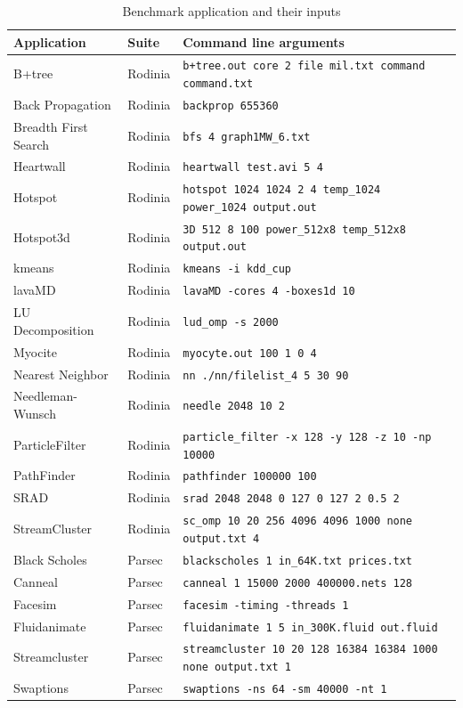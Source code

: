 \documentclass[12pt,twoside]{reedthesis}
\begin{document}
		
		\begin{table}
			\caption{Benchmark application and their inputs}
			\label{all-applications-table}
			\small
			\begin{tabular}{ |l|l|l| }
				\hline
				Application          & Suite   & Command line arguments  \\ \hline
				\hline
				B+tree & Rodinia  &  \texttt{b+tree.out core 2 file mil.txt command command.txt}  \\ \hline
				Back Propagation & Rodinia  &  \texttt{backprop 655360} \\ \hline
				Breadth First Search & Rodinia  &  \texttt{bfs 4 graph1MW\_6.txt}  \\ \hline
				Heartwall & Rodinia  & \texttt{heartwall test.avi 5 4} \\ \hline
				Hotspot & Rodinia  &   \texttt{hotspot 1024 1024 2 4 temp\_1024 power\_1024 output.out} \\ \hline
				Hotspot3d & Rodinia  & \texttt{3D 512 8 100 power\_512x8 temp\_512x8 output.out}   \\ \hline
				kmeans & Rodinia  &    \texttt{kmeans -i kdd\_cup} \\ \hline
				lavaMD & Rodinia  &  \texttt{lavaMD -cores 4 -boxes1d 10}   \\ \hline
				LU Decomposition & Rodinia    &  \texttt{lud\_omp -s 2000} \\ \hline
				Myocite & Rodinia  &  \texttt{myocyte.out 100 1 0 4}  \\ \hline
				Nearest Neighbor & Rodinia  &  \texttt{nn ./nn/filelist\_4 5 30 90}   \\ \hline
				Needleman-Wunsch & Rodinia  & \texttt{needle 2048 10 2}    \\ \hline
				ParticleFilter & Rodinia  &    \texttt{particle\_filter -x 128 -y 128 -z 10 -np 10000} \\ \hline
				PathFinder & Rodinia  &  \texttt{pathfinder 100000 100}   \\ \hline
				SRAD & Rodinia  &  \texttt{srad 2048 2048 0 127 0 127 2 0.5 2}   \\ \hline
				StreamCluster & Rodinia  &    \texttt{sc\_omp 10 20 256 4096 4096 1000 none output.txt 4} \\ \hline
				Black Scholes & Parsec  &  \texttt{blackscholes 1 in\_64K.txt prices.txt} \\ \hline
				Canneal & Parsec  &  \texttt{canneal 1 15000 2000 400000.nets 128} \\ \hline
				Facesim & Parsec  &  \texttt{facesim -timing -threads 1} \\ \hline
				Fluidanimate & Parsec  &  \texttt{fluidanimate 1 5 in\_300K.fluid out.fluid} \\ \hline
				Streamcluster & Parsec  &  \texttt{streamcluster 10 20 128 16384 16384 1000 none output.txt 1} \\ \hline
				Swaptions & Parsec  &  \texttt{swaptions -ns 64 -sm 40000 -nt 1} \\ \hline
			\end{tabular}
		\end{table}
		
\end{document}
